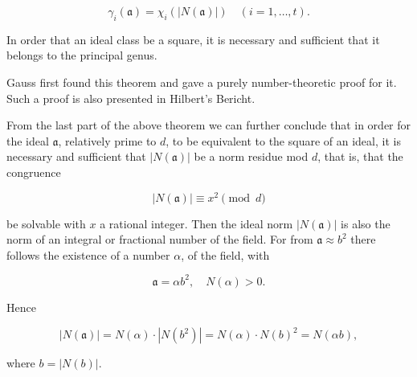 $$\gamma_i(\mathfrak{a}) = \chi_i(|N(\mathfrak{a})|) \quad (i = 1, \ldots, t).$$

In order that an ideal class be a square, it is necessary and sufficient that it belongs to the principal genus.

Gauss first found this theorem and gave a purely number-theoretic proof for it. Such a proof is also presented in Hilbert’s Bericht.

From the last part of the above theorem we can further conclude that in order for the ideal $\mathfrak{a}$, relatively prime to $d$, to be equivalent to the square of an ideal, it is necessary and sufficient that $|N(\mathfrak{a})|$ be a norm residue mod $d$, that is, that the congruence

$$|N(\mathfrak{a})| \equiv x^2 \pmod{d}$$

be solvable with $x$ a rational integer. Then the ideal norm $|N(\mathfrak{a})|$ is also the norm of an integral or fractional number of the field. For from $\mathfrak{a} \approx b^2$ there follows the existence of a number $\alpha$, of the field, with

$$\mathfrak{a} = \alpha b^2, \quad N(\alpha) > 0.$$

Hence

$$|N(\mathfrak{a})| = N(\alpha) \cdot |N(b^2)| = N(\alpha) \cdot N(b)^2 = N(\alpha b),$$

where $b = |N(b)|$.
